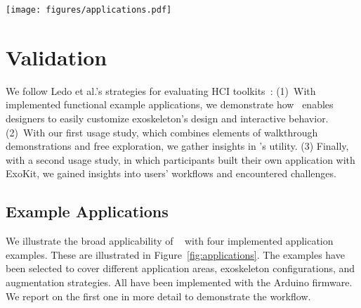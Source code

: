 \begin{figure*}[t]
    \centering
    \texttt{[image: figures/applications.pdf]}
    \caption{\toolkit~can be used for versatile applications, such as for (a) physical motion guidance for strength exercises, (b) haptic feedback in VR, (c) collaborative body-actuated plays, and (d) artistic modulation of motion in real-time.
    }
    \label{fig:applications}
\end{figure*}
\section{Validation}
We follow Ledo et al.'s strategies for evaluating HCI toolkits~\cite{ledo_2018}: (1)~With implemented functional example applications, we demonstrate how \toolkit~enables designers to easily customize exoskeleton's design and interactive behavior. (2)~With our first usage study, which combines elements of walkthrough demonstrations and free exploration, we gather insights in \toolkit's utility. (3) Finally, with a second usage study, in which participants built their own application with ExoKit, we gained insights into users' workflows and encountered challenges.


\subsection{Example Applications}\label{sec:applications}
We illustrate the broad applicability of \toolkit~ with four implemented application examples. These are illustrated in Figure~\ref{fig:applications}.
The examples have been selected to cover different application areas, exoskeleton configurations, and augmentation strategies. All have been implemented with the Arduino firmware. We report on the first one in more detail to demonstrate the workflow. 

